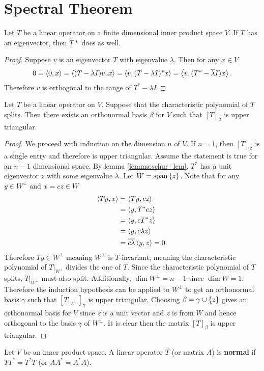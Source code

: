 \documentclass{subfiles}
\begin{document}
\chapter{Spectral Theorem}

\begin{lemma}
    \label{lemma:schur_lem}
    Let $T$ be a linear operator on a finite dimensional inner product space $V$. If $T$ has an eigenvector, then $T*$ does as well.
\end{lemma}

\begin{proof}
    Suppose $v$ is an eigenvector $T$ with eigenvalue $\lambda$. Then for any $x \in V$
    \[
        0 = \left\langle 0, x \right\rangle = \left\langle (T - \lambda I)v, x \right\rangle = \left\langle v, (T - \lambda I)^* x \right\rangle = \left\langle v, (T^* - \overline{\lambda} I)x \right\rangle
    .\]
    Therefore $v$ is orthogonal to the range of $T^* - \lambda I$
\end{proof}

\begin{theorem}
    \label{thm:schurs}
    Let $T$ be a linear operator on $V$. Suppose that the characteristic polynomial of $T$ splits. Then there exists an orthonormal basis $\beta$ for $V$ such that $[T]_{\beta}$ is upper triangular.
\end{theorem}

\begin{proof}
    We proceed with induction on the dimension $n$ of $V$. If $n = 1$, then $[T]_\beta$ is a single entry and therefore is upper triangular. Assume the statement is true for an $n-1$ dimensional space. By lemma \ref{lemma:schur_lem}, $T^*$ has a unit eigenvector $z$ with some eigenvalue $\lambda$. Let $W = \operatorname{span}\qty{z}$. Note that for any $y \in W^\perp$ and $x = cz \in W$
    \begin{align*}
        \left\langle Ty, x \right\rangle &= \left\langle Ty,cz \right\rangle \\
                     &= \left\langle y, T^* cz \right\rangle \\
                     &= \left\langle y, c T^* z \right\rangle \\
                     &= \left\langle y, c \lambda z \right\rangle \\
                     &= \overline{c \lambda} \left\langle y, z \right\rangle = 0.
    \end{align*}
    Therefore $Ty \in W^\perp$ meaning $W^\perp$ is $T$-invariant, meaning the characteristic polynomial of $T \vert_{W^\perp}$ divides the one of $T$. Since the characteristic polynomial of $T$ splits, $T \vert_{W^\perp}$ must also split. Additionally, $\dim W^\perp = n - 1$ since $\dim W = 1$. Therefore the induction hypothesis can be applied to $W^\perp$ to get an orthonormal basis $\gamma$ such that $[T \vert_{W^\perp}]_{\gamma}$ is upper triangular. Choosing $\beta = \gamma \cup \qty{z}$ gives an orthonormal basis for $V$ since $z$ is a unit vector and $z$ is from $W$ and hence orthogonal to the basis $\gamma$ of $W^\perp$. It is clear then the matrix $[T]_\beta$ is upper triangular.
\end{proof}

\begin{definition}
    Let $V$ be an inner product space. A linear operator $T$ (or matrix $A$) is \textbf{normal} if $T T^* = T^* T$ (or $A A^* = A^* A$).
\end{definition}
\end{document}
